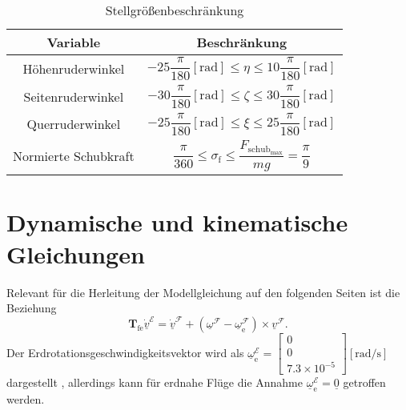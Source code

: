 \begin{table}[h]
\centering
\setlength{\tabcolsep}{12pt} %
\renewcommand{\arraystretch}{1.5} %
 \begin{tabular}{||c c ||} 
 \hline
 Variable & Beschränkung \\ [0.5ex] 
 \hline\hline
  Höhenruderwinkel & $-25\dfrac{\pi}{180}[\mathrm{rad}]\leq\eta\leq 10\dfrac{\pi}{180}[\mathrm{rad}]$\\
  Seitenruderwinkel & $-30 \dfrac{\pi}{180}[\mathrm{rad}]\leq\zeta\leq 30\dfrac{\pi}{180}[\mathrm{rad}]$\\
  Querruderwinkel & $-25 \dfrac{\pi}{180}[\mathrm{rad}]\leq\xi\leq 25\dfrac{\pi}{180}[\mathrm{rad}]$\\
  Normierte Schubkraft & $\dfrac{\pi}{360}\leq\sigma_\mathrm{f}\leq \dfrac{F_\mathrm{schub_{max}}}{mg} = \dfrac{\pi}{9}$\\ 
\hline
\end{tabular}
\caption{Stellgrößenbeschränkung}
\label{tab:SGF}
\end{table}


\section{Dynamische und kinematische Gleichungen}
\label{sec:Dynamik}
Relevant für die Herleitung der Modellgleichung auf den folgenden Seiten ist die Beziehung\\
\begin{equation}
\label{fun:Tfe}
\textbf{T}_\mathrm{fe}\underline{\dot{v}}^\mathcal{E} = \underline{\dot{v}}^\mathcal{F} + (\underline{\omega}^\mathcal{F}-\underline{\omega}^\mathcal{F}_\mathrm{e})\times\underline{v}^\mathcal{F}.
\end{equation}
Der Erdrotationsgeschwindigkeitsvektor wird als $\underline{\omega}^\mathcal{E}_\mathrm{e} = \begin{bmatrix} 
0 \\ 0 \\ 7.3\times 10^{-5} 
\end{bmatrix}\mathrm{[rad/s]}$ dargestellt \cite{FlugmechanikBuch}, allerdings kann für erdnahe Flüge die Annahme $\underline{\omega}^\mathcal{E}_\mathrm{e} = \underline{0}$ getroffen werden.
